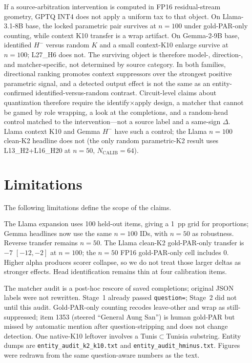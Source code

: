 \documentclass{article} %
\begin{document}
If a source-arbitration intervention is computed in FP16 residual-stream geometry, GPTQ INT4 does not apply a uniform tax to that object. On Llama-3.1-8B base, the locked parametric pair survives at $n{=}100$ under gold-PAR-only counting, while context K10 transfer is a wrap artifact. On Gemma-2-9B base, identified $H^{-}$ versus random $K$ and a small context-K10 enlarge survive at $n{=}100$; L27\_H6 does not. The surviving object is therefore model-, direction-, and matcher-specific, not determined by source category. In both families, directional ranking promotes context suppressors over the strongest positive parametric signal, and a detected output effect is not the same as an entity-confirmed identified-versus-random contrast. Circuit-level claims about quantization therefore require the identify$\times$apply design, a matcher that cannot be gamed by role wrapping, a look at the completions, and a random-head control matched to the intervention---not a source label and a same-sign $\Delta$. Llama context K10 and Gemma $H^{-}$ have such a control; the Llama $n{=}100$ clean-K2 headline does not (the only random parametric-K2 result uses L13\_H2+L16\_H20 at $n{=}50$, $N_{\mathrm{CALIB}}{=}64$).

\section{Limitations}
\label{sec:limitations}

The following limitations define the scope of the claims.

The Llama expansion uses 100 held-out items, giving a 1~pp grid for proportions; Gemma headlines now use the same $n{=}100$ IDs, with $n{=}50$ as robustness. Reverse transfer remains $n{=}50$. The Llama clean-K2 gold-PAR-only transfer is $-7$ $[-12,-2]$ at $n{=}100$; the $n{=}50$ FP16 gold-PAR-only cell includes 0. Higher alpha produces scorer collapse, so we do not treat those larger deltas as stronger effects. Head identification remains thin at four calibration items.

The matcher audit is a post-hoc rescore of saved completions; original JSON labels were not rewritten. Stage~1 already passed \texttt{question=}; Stage~2 did not until this audit. Gold-PAR-only counting recodes leave-other and wrap as still-suppressed; item 1353 (steered ``General Aung San'') is human gold-PAR but missed by automatic mention after question-stripping and does not change detection. One native-K10 leftover involves a Tunis$\subset$Tunisia substring. Entity dumps are \texttt{entity\_audit\_k2\_k10.txt} and \texttt{entity\_audit\_hminus.txt}. Figures were redrawn from the same question-aware numbers as the text.
\end{document}
